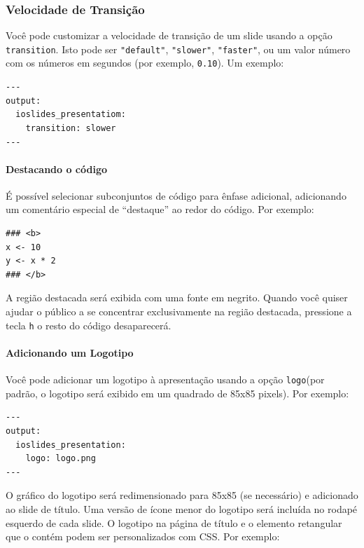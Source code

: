 \documentclass[
]{book}
\begin{document}
\hypertarget{velocidade-de-transiuxe7uxe3o}{%
\subsubsection*{Velocidade de Transição}\label{velocidade-de-transiuxe7uxe3o}}

Você pode customizar a velocidade de transição de um slide usando a opção \texttt{transition}. Isto pode ser \texttt{"default"}, \texttt{"slower"}, \texttt{"faster"}, ou um valor número com os números em segundos (por exemplo, \texttt{0.10}). Um exemplo:

\begin{verbatim}
---
output:
  ioslides_presentatiom:
    transition: slower
---
\end{verbatim}

\hypertarget{destacando-o-cuxf3digo}{%
\paragraph{Destacando o código}\label{destacando-o-cuxf3digo}}

É possível selecionar subconjuntos de código para ênfase adicional, adicionando um comentário especial de ``destaque'' ao redor do código. Por exemplo:

\begin{verbatim}
### <b>
x <- 10
y <- x * 2
### </b>
\end{verbatim}

A região destacada será exibida com uma fonte em negrito. Quando você quiser ajudar o público a se concentrar exclusivamente na região destacada, pressione a tecla \texttt{h} o resto do código desaparecerá.

\hypertarget{adicionando-um-logotipo}{%
\paragraph{Adicionando um Logotipo}\label{adicionando-um-logotipo}}

Você pode adicionar um logotipo à apresentação usando a opção \texttt{logo}(por padrão, o logotipo será exibido em um quadrado de 85x85 pixels). Por exemplo:

\begin{verbatim}
---
output:
  ioslides_presentation:
    logo: logo.png
---
\end{verbatim}

O gráfico do logotipo será redimensionado para 85x85 (se necessário) e adicionado ao slide de título. Uma versão de ícone menor do logotipo será incluída no rodapé esquerdo de cada slide.
O logotipo na página de título e o elemento retangular que o contém podem ser personalizados com CSS. Por exemplo:
\end{document}
